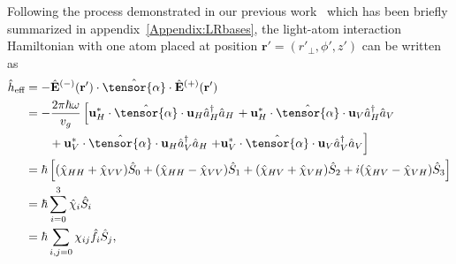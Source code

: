 \documentclass[aps,pra,twocolumn,superscriptaddress]{revtex4-1} %
\def\br{\mathbf{r}}
\newcommand{\nn}{\nonumber}
\newcommand{\eff}{\text{eff}}
\begin{document}
Following the process demonstrated in our previous work~\cite{Qi2016} which has been briefly summarized in appendix~\ref{Appendix:LRbases}, the light-atom interaction Hamiltonian with one atom placed at position $ \br'=(r'\!_\perp,\phi',z') $ can be written as
\begin{align}
\hat{h}_\eff &= -\hat{\mathbf{E}}^{(-)}(\br')\cdot\hat{\tensor{\mathbf{\alpha}}}\cdot\hat{\mathbf{E}}^{(+)}(\br')\nn\\
&= -\frac{2\pi\hbar\omega}{v_g}\left[\mathbf{u}_H^*\cdot\hat{\tensor{\mathbf{\alpha}}}\cdot \mathbf{u}_H\hat{a}_H^\dagger\hat{a}_H\right.
+ \mathbf{u}_H^*\cdot\hat{\tensor{\mathbf{\alpha}}}\cdot \mathbf{u}_V\hat{a}_H^\dagger\hat{a}_V\nn\\
&\quad\quad + \mathbf{u}_V^*\cdot\hat{\tensor{\mathbf{\alpha}}}\cdot \mathbf{u}_H\hat{a}_V^\dagger\hat{a}_H 
\left. + \mathbf{u}_V^*\cdot\hat{\tensor{\mathbf{\alpha}}}\cdot \mathbf{u}_V\hat{a}_V^\dagger\hat{a}_V\right]\\
&= \hbar\left[(\hat{\chi}_{HH}+\hat{\chi}_{VV})\hat{S}_0 + (\hat{\chi}_{HH}-\hat{\chi}_{VV})\hat{S}_1 + (\hat{\chi}_{HV}+\hat{\chi}_{VH})\hat{S}_2 + i(\hat{\chi}_{HV}-\hat{\chi}_{VH})\hat{S}_3 \right] \label{eq:heff_chiHV}\\
&=\hbar\sum_{i=0}^3 \hat{\chi}_{i}\hat{S}_i\\
&=\hbar\sum_{i,j=0} \chi_{ij}\hat{f}_i\hat{S}_j,
\end{align}
\end{document}
